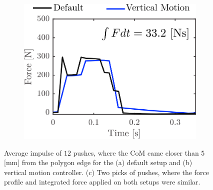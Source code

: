 \begin{figure}
\begin{subfigure}{0.32\textwidth}
  \includegraphics[width=.95\linewidth]{STYLESTUFF/impulsecompare31.png}
  \caption{}
   \label{fig:imp3}
  \end{subfigure}
  \caption{Average impulse of $12$ pushes, where the \ac{CoM} came closer than $5$ [mm] from the polygon edge for the (a) default setup and (b) vertical motion controller. (c) Two picks of pushes, where the force profile and integrated force applied on both setups were similar. }
  \label{fig:impulsecompare}
\end{figure}

